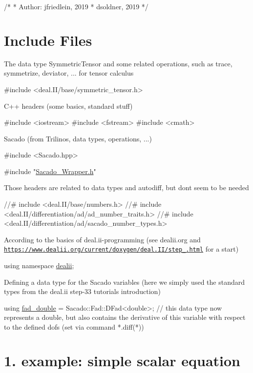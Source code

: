 \begin{DoxyCode}
\textcolor{comment}{/*}
\textcolor{comment}{ * Author: jfriedlein, 2019}
\textcolor{comment}{ *      dsoldner, 2019}
\textcolor{comment}{ */}
\end{DoxyCode}
 \hypertarget{index_includes}{}\section{Include Files}\label{index_includes}
The data type Symmetric\+Tensor and some related operations, such as trace, symmetrize, deviator, ... for tensor calculus 
\begin{DoxyCode}
\textcolor{preprocessor}{#include <deal.II/base/symmetric\_tensor.h>}
\end{DoxyCode}
 C++ headers (some basics, standard stuff) 
\begin{DoxyCode}
\textcolor{preprocessor}{#include <iostream>}
\textcolor{preprocessor}{#include <fstream>}
\textcolor{preprocessor}{#include <cmath>}
\end{DoxyCode}
 Sacado (from Trilinos, data types, operations, ...) 
\begin{DoxyCode}
\textcolor{preprocessor}{#include <Sacado.hpp>}
 
\textcolor{preprocessor}{#include "\hyperlink{Sacado__Wrapper_8h}{Sacado\_Wrapper.h}"}
\end{DoxyCode}
 Those headers are related to data types and autodiff, but don\textquotesingle{}t seem to be needed 
\begin{DoxyCode}
\textcolor{comment}{//#  include <deal.II/base/numbers.h>}
\textcolor{comment}{//#  include <deal.II/differentiation/ad/ad\_number\_traits.h>}
\textcolor{comment}{//#  include <deal.II/differentiation/ad/sacado\_number\_types.h>}
\end{DoxyCode}
 According to the basics of deal.\+ii-\/programming (see dealii.\+org and \href{https://www.dealii.org/current/doxygen/deal.II/step_1.html}{\tt https\+://www.\+dealii.\+org/current/doxygen/deal.\+I\+I/step\+\_.\+html} for a start) 
\begin{DoxyCode}
\textcolor{keyword}{using namespace }\hyperlink{namespacedealii}{dealii};
\end{DoxyCode}
 Defining a data type for the Sacado variables (here we simply used the standard types from the deal.\+ii step-\/33 tutorial\textquotesingle{}s introduction) 
\begin{DoxyCode}
\textcolor{keyword}{using} \hyperlink{Sacado__example_8cc_a868b94676739e612d9c95940e70892a9}{fad\_double} = Sacado::Fad::DFad<double>;   \textcolor{comment}{// this data type now represents a double, but
       also contains the derivative of this variable with respect to the defined dofs (set via command *.diff(*))}
\end{DoxyCode}
 \hypertarget{index_Ex1}{}\section{1. example\+: simple scalar equation}\label{index_Ex1}

